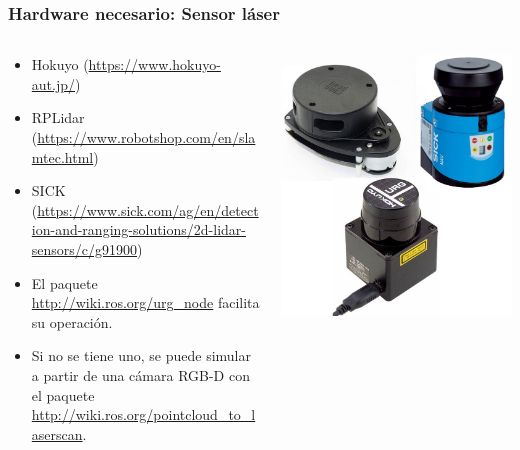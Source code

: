 \documentclass[10pt,spanish,aspectratio=1610]{beamer}
\begin{document}
\begin{frame}\frametitle{Hardware necesario: Sensor láser}
  \begin{columns}
    \begin{column}{0.5\textwidth}
      \begin{itemize}
      \item Hokuyo (\url{https://www.hokuyo-aut.jp/})
      \item RPLidar (\url{https://www.robotshop.com/en/slamtec.html})
      \item SICK (\url{https://www.sick.com/ag/en/detection-and-ranging-solutions/2d-lidar-sensors/c/g91900})
      \item El paquete \url{http://wiki.ros.org/urg_node} facilita su operación.
      \item Si no se tiene uno, se puede simular a partir de una cámara RGB-D con el paquete \url{http://wiki.ros.org/pointcloud_to_laserscan}.
      \end{itemize}
    \end{column}
    \begin{column}{0.4\textwidth}
      \includegraphics[width=\textwidth]{Figures/lasers.jpg}
    \end{column}
  \end{columns}
\end{frame}
\end{document}
